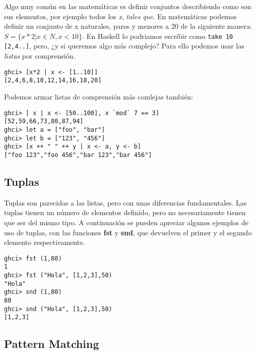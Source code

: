 Algo muy común en las matemáticas es definir conjuntos describiendo como son sus elementos, por ejemplo todos los \textit{x}, \textit{tales que}. En matemáticas podemos definir un conjunto de x naturales, pares y menores a 20 de la siguiente manera: \(S=\{x*2 | x \in N, x < 10\}\). En Haskell lo podriamos escribir como \lstinline$take 10 [2,4..]$, pero, ¿y si queremos algo más complejo? Para ello podemos usar las \textit{listas} por comprensión.

\begin{lstlisting}
ghci> [x*2 | x <- [1..10]]
[2,4,6,8,10,12,14,16,18,20]
\end{lstlisting}

Podemos armar listas de comprensión más comlejas también:

\begin{lstlisting}
ghci> [ x | x <- [50..100], x `mod` 7 == 3]
[52,59,66,73,80,87,94]
ghci> let a = ["foo", "bar"]
ghci> let b = ["123", "456"]
ghci> [x ++ " " ++ y | x <- a, y <- b]
["foo 123","foo 456","bar 123","bar 456"]
\end{lstlisting}




\subsection{Tuplas} %
\label{sub:tuplas}

Tuplas son parecidas a las listas, pero con unas diferencias fundamentales. Las tuplas tienen un número de elementos definido, pero no necesariamente tienen que ser del mismo tipo. A continuación se pueden apreciar algunos ejemplos de uso de tuplas, con las funciones \textbf{fst} y \textbf{snd}, que devuelven el primer y el segundo elemento respectivamente.

\begin{lstlisting}
ghci> fst (1,80)
1
ghci> fst ("Hola", [1,2,3],50)
"Hola"
ghci> snd (1,80)
80
ghci> snd ("Hola", [1,2,3],50)
[1,2,3]
\end{lstlisting}

\subsection{Pattern Matching} %
\label{sub:pattern_matching}

